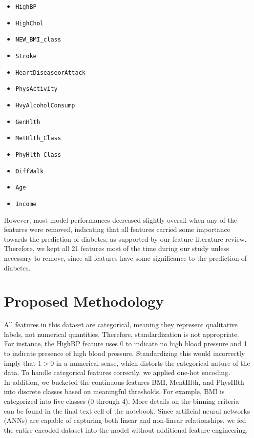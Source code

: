 \documentclass[conference]{IEEEtran}
\begin{document}
\begin{itemize}
  \item \texttt{HighBP}
  \item \texttt{HighChol}
  \item \texttt{NEW\_BMI\_class}
  \item \texttt{Stroke}
  \item \texttt{HeartDiseaseorAttack}
  \item \texttt{PhysActivity}
  \item \texttt{HvyAlcoholConsump}
  \item \texttt{GenHlth}
  \item \texttt{MetHlth\_Class}
  \item \texttt{PhyHlth\_Class}
  \item \texttt{DiffWalk}
  \item \texttt{Age}
  \item \texttt{Income}
\end{itemize}
\vspace{1em}

However, most model performances decreased slightly overall when any of the features were removed, indicating that all features carried some importance towards the prediction of diabetes, as supported by our feature literature review.  Therefore, we kept all 21 features most of the time during our study unless necessary to remove, since all features have some significance to the prediction of diabetes.\\


\section{Proposed Methodology}
All features in this dataset are categorical, meaning they represent qualitative labels, not numerical quantities. Therefore, standardization is not appropriate. For instance, the HighBP feature uses 0 to indicate no high blood pressure and 1 to indicate presence of high blood pressure. Standardizing this would incorrectly imply that \( 1 > 0 \) in a numerical sense, which distorts the categorical nature of the data. To handle categorical features correctly, we applied one-hot encoding.\\ 

In addition, we bucketed the continuous features BMI, MentHlth, and PhysHlth into discrete classes based on meaningful thresholds. For example, BMI is categorized into five classes (0 through 4). More details on the binning criteria can be found in the final text cell of the notebook. Since artificial neural networks (ANNs) are capable of capturing both linear and non-linear relationships, we fed the entire encoded dataset into the model without additional feature engineering.\\
\end{document}
